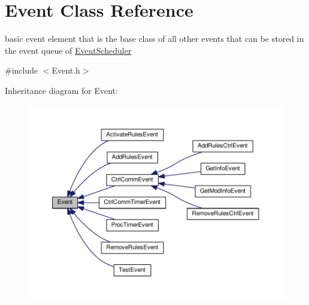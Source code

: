 \hypertarget{classEvent}{}\section{Event Class Reference}
\label{classEvent}


basic event element that is the base class of all other events that can be stored in the event queue of \hyperlink{classEventScheduler}{Event\+Scheduler}  




{\ttfamily \#include $<$Event.\+h$>$}



Inheritance diagram for Event\+:
\nopagebreak
\begin{figure}[H]
\begin{center}
\leavevmode
\includegraphics[width=350pt]{classEvent__inherit__graph}
\end{center}
\end{figure}
